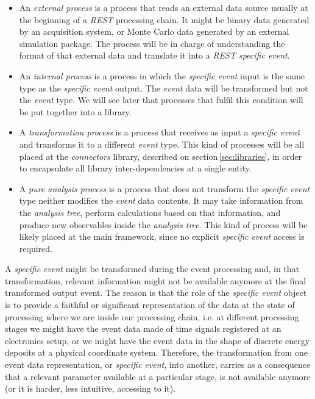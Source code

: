 \begin{itemize}
\item An \emph{external process} is a process that reads an external data source usually at the beginning of a \emph{REST} processing chain. It might be binary data generated by an acquisition system, or Monte Carlo data generated by an external simulation package. The process will be in charge of understanding the format of that external data and translate it into a \emph{REST specific event}.

\item An \emph{internal process} is a process in which the \emph{specific event} input is the same type as the \emph{specific event} output. The \emph{event} data will be transformed but not the \emph{event} type. We will see later that processes that fulfil this condition will be put together into a library.

\item A \emph{transformation process} is a process that receives as input a \emph{specific event} and transforms it to a different \emph{event} type. This kind of processes will be all placed at the \emph{connectors} library, described on section\,\ref{sec:libraries}, in order to encapsulate all library inter-dependencies at a single entity. 

\item A \emph{pure analysis process} is a process that does not transform the \emph{specific event} type neither modifies the \emph{event} data contents. It may take information from the \emph{analysis tree}, perform calculations based on that information, and produce new observables inside the \emph{analysis tree}. This kind of process will be likely placed at the main framework, since no explicit \emph{specific event} access is required.
\end{itemize}

A \emph{specific event} might be transformed during the event processing and, in that transformation, relevant information might not be available anymore at the final transformed output event. The reason is that the role of the \emph{specific event} object is to provide a faithful or significant representation of the data at the state of processing where we are inside our processing chain, i.e. at different processing stages we might have the event data made of time signals registered at an electronics setup, or we might have the event data in the shape of discrete energy deposits at a physical coordinate system. Therefore, the transformation from one event data representation, or \emph{specific event}, into another, carries as a consequence that a relevant parameter available at a particular stage, is  not available anymore (or it is harder, less intuitive, accessing to it). 

